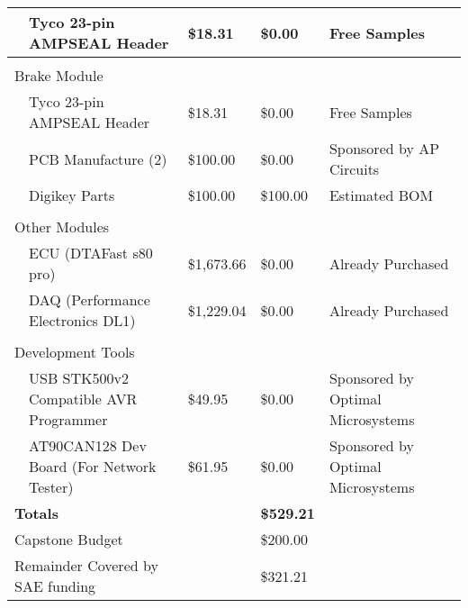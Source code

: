 \begin{scriptsize}
\begin{tabular}{|l|>{\raggedright}p{}|l|l|>{\raggedright}p{}|}
    \hline 
    & Tyco 23-pin AMPSEAL Header & \$18.31 & \$0.00 & Free Samples\tabularnewline
    \hline 
    \multicolumn{1}{|l}{} & \multicolumn{1}{>{\raggedright}p{0.35\columnwidth}}{} & \multicolumn{1}{l}{} & \multicolumn{1}{l}{} & \tabularnewline
    \hline 
    \multicolumn{2}{|l|}{Brake Module} &  &  & \tabularnewline
    \hline 
    & Tyco 23-pin AMPSEAL Header & \$18.31 & \$0.00 & Free Samples\tabularnewline
    \hline 
    & PCB Manufacture (2) & \$100.00 & \$0.00 & Sponsored by AP Circuits\tabularnewline
    \hline 
    & Digikey Parts & \$100.00 & \$100.00 & Estimated BOM\tabularnewline
    \hline 
    \multicolumn{1}{|l}{} & \multicolumn{1}{>{\raggedright}p{0.35\columnwidth}}{} & \multicolumn{1}{l}{} & \multicolumn{1}{l}{} & \tabularnewline
    \hline 
    \multicolumn{2}{|l|}{Other Modules} &  &  & \tabularnewline
    \hline 
    & ECU (DTAFast s80 pro) & \$1,673.66 & \$0.00 & Already Purchased\tabularnewline
    \hline 
    & DAQ (Performance Electronics DL1) & \$1,229.04 & \$0.00 & Already Purchased\tabularnewline
    \hline 
    \multicolumn{1}{|l}{} & \multicolumn{1}{>{\raggedright}p{0.35\columnwidth}}{} & \multicolumn{1}{l}{} & \multicolumn{1}{l}{} & \tabularnewline
    \hline 
    \multicolumn{2}{|l|}{Development Tools} &  &  & \tabularnewline
    \hline 
    & USB STK500v2 Compatible AVR Programmer & \$49.95 & \$0.00 & Sponsored by Optimal Microsystems\tabularnewline
    \hline 
    & AT90CAN128 Dev Board (For Network Tester) & \$61.95 & \$0.00 & Sponsored by Optimal Microsystems\tabularnewline
    \hline
    \hline 
    \multicolumn{2}{|l}{\textbf{Totals}} & \multicolumn{1}{l}{\textbf{\$4,469.88} } & \multicolumn{1}{l}{\textbf{\$529.21} } & \tabularnewline
    \hline
    \multicolumn{2}{|l}{Capstone Budget} & \multicolumn{1}{l}{} & \multicolumn{1}{l}{\$200.00} & \tabularnewline
    \hline 
    \multicolumn{2}{|l}{Remainder Covered by SAE funding} & \multicolumn{1}{l}{} & \multicolumn{1}{l}{\$321.21} & \tabularnewline
    \hline
  \end{tabular}
\end{scriptsize}